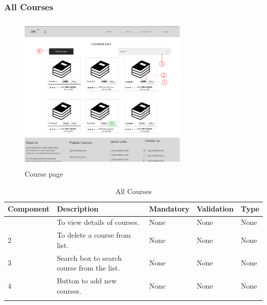 \documentclass[12pt]{article}
\begin{document}
\subsubsection{All Courses}
\begin{figure}[H]
  \centering
  \includegraphics[width=8cm, height=7.5cm]{AllCoursespage(Teacher)}
  \caption{Course page}
\end{figure}
\begin{longtable}{|>{\raggedright\arraybackslash}p{2.5cm}|>{\raggedright\arraybackslash}p{2.5cm}|>{\raggedright\arraybackslash}p{2.5cm}|>{\raggedright\arraybackslash}p{2cm}|>{\raggedright\arraybackslash}p{2cm}|}
\hline
\textbf{Component} & \textbf{Description} & \textbf{Mandatory} & \textbf{Validation} & \textbf{Type}\\
\hline
1 &
To view details of courses. &
None &
None &
None 
\\
\hline

2 &
To delete a course from list. &
None &
None &
None 
\\
\hline

3 &
Search box to search course from the list. &
None &
None &
None 
\\
\hline

4 &
Button to add new courses. &
None &
None &
None 
\\
\hline

\caption{All Courses}
\end{longtable}
\end{document}
